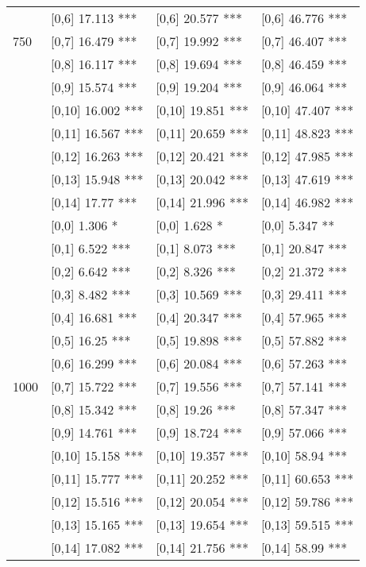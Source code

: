 \begin{table}
\begin{tabular}[t]{llll}
 & {}[0,6] 17.113 *** & {}[0,6] 20.577 *** & {}[0,6] 46.776 ***\\
750 & {}[0,7] 16.479 *** & {}[0,7] 19.992 *** & {}[0,7] 46.407 ***\\
 & {}[0,8] 16.117 *** & {}[0,8] 19.694 *** & {}[0,8] 46.459 ***\\
 & {}[0,9] 15.574 *** & {}[0,9] 19.204 *** & {}[0,9] 46.064 ***\\
\addlinespace
 & {}[0,10] 16.002 *** & {}[0,10] 19.851 *** & {}[0,10] 47.407 ***\\
 & {}[0,11] 16.567 *** & {}[0,11] 20.659 *** & {}[0,11] 48.823 ***\\
 & {}[0,12] 16.263 *** & {}[0,12] 20.421 *** & {}[0,12] 47.985 ***\\
 & {}[0,13] 15.948 *** & {}[0,13] 20.042 *** & {}[0,13] 47.619 ***\\
 & {}[0,14] 17.77 *** & {}[0,14] 21.996 *** & {}[0,14] 46.982 ***\\
\addlinespace
 & {}[0,0] 1.306 * & {}[0,0] 1.628 * & {}[0,0] 5.347 **\\
 & {}[0,1] 6.522 *** & {}[0,1] 8.073 *** & {}[0,1] 20.847 ***\\
 & {}[0,2] 6.642 *** & {}[0,2] 8.326 *** & {}[0,2] 21.372 ***\\
 & {}[0,3] 8.482 *** & {}[0,3] 10.569 *** & {}[0,3] 29.411 ***\\
 & {}[0,4] 16.681 *** & {}[0,4] 20.347 *** & {}[0,4] 57.965 ***\\
\addlinespace
 & {}[0,5] 16.25 *** & {}[0,5] 19.898 *** & {}[0,5] 57.882 ***\\
 & {}[0,6] 16.299 *** & {}[0,6] 20.084 *** & {}[0,6] 57.263 ***\\
1000 & {}[0,7] 15.722 *** & {}[0,7] 19.556 *** & {}[0,7] 57.141 ***\\
 & {}[0,8] 15.342 *** & {}[0,8] 19.26 *** & {}[0,8] 57.347 ***\\
 & {}[0,9] 14.761 *** & {}[0,9] 18.724 *** & {}[0,9] 57.066 ***\\
\addlinespace
 & {}[0,10] 15.158 *** & {}[0,10] 19.357 *** & {}[0,10] 58.94 ***\\
 & {}[0,11] 15.777 *** & {}[0,11] 20.252 *** & {}[0,11] 60.653 ***\\
 & {}[0,12] 15.516 *** & {}[0,12] 20.054 *** & {}[0,12] 59.786 ***\\
 & {}[0,13] 15.165 *** & {}[0,13] 19.654 *** & {}[0,13] 59.515 ***\\
 & {}[0,14] 17.082 *** & {}[0,14] 21.756 *** & {}[0,14] 58.99 ***\\
\bottomrule
\end{tabular}
\end{table}
